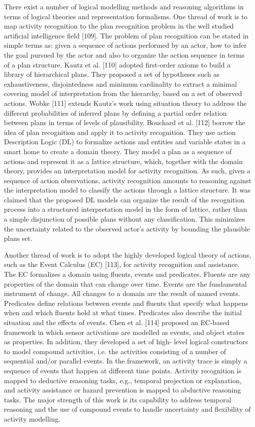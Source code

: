 There exist a number of logical modelling methods and reasoning algorithms in terms of logical theories and representation formalisms. One thread of work is to map activity recognition to the plan recognition problem in the well studied artificial intelligence field [109]. The problem of plan recognition can be stated in simple terms as: given a sequence of actions performed by an actor, how to infer the goal pursued by the actor and also to organize the action sequence in terms of a plan structure. Kautz et al. [110] adopted first-order axioms to build a library of hierarchical plans. They proposed a set of hypotheses such as exhaustiveness, disjointedness and minimum cardinality to extract a minimal covering model of interpretation from the hierarchy, based on a set of observed actions. Wobke [111] extends Kautz’s work using situation theory to address the different probabilities of inferred plans by defining a partial order relation between plans in terms of levels of plausibility. Bouchard et al. [112] borrow the idea of plan recognition and apply it to activity recognition. They use action Description Logic (DL) to formalize actions and entities and variable states in a smart home to create a domain theory. They model a plan as a sequence of actions and represent it as a lattice structure, which, together with the domain theory, provides an interpretation model for activity recognition. As such, given a sequence of action observations, activity recognition amounts to reasoning against the interpretation model to classify the actions through a lattice structure. It was claimed that the proposed DL models can organize the result of the recognition process into a structured interpretation model in the form of lattice, rather than a simple disjunction of possible plans without any classification. This minimizes the uncertainty related to the observed actor’s activity by bounding the plausible plans set.

Another thread of work is to adopt the highly developed logical theory of actions, such as the Event Calculus (EC) [113], for activity recognition and assistance. The EC formalizes a domain using fluents, events and predicates. Fluents are any properties of the domain that can change over time. Events are the fundamental instrument of change. All changes to a domain are the result of named events. Predicates define relations between events and fluents that specify what happens when and which fluents hold at what times. Predicates also describe the initial situation and the effects of events. Chen et al. [114] proposed an EC-based framework in which sensor activations are modelled as events, and object states as properties. In addition, they developed a set of high- level logical constructors to model compound activities, i.e. the activities consisting of a number of sequential and/or parallel events. In the framework, an activity trace is simply a sequence of events that happen at different time points. Activity recognition is mapped to deductive reasoning tasks, e.g., temporal projection or explanation, and activity assistance or hazard prevention is mapped to abductive reasoning tasks. The major strength of this work is its capability to address temporal reasoning and the use of compound events to handle uncertainty and flexibility of activity modelling. 

